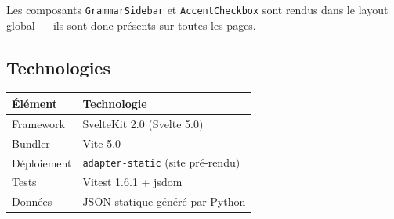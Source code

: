 Les composants \texttt{GrammarSidebar} et \texttt{AccentCheckbox} sont rendus dans le layout global --- ils sont donc présents sur toutes les pages.

\subsection{Technologies}

\begin{tabular}{ll}
  \toprule
  \textbf{Élément} & \textbf{Technologie} \\
  \midrule
  Framework & SvelteKit 2.0 (Svelte 5.0) \\
  Bundler & Vite 5.0 \\
  Déploiement & \texttt{adapter-static} (site pré-rendu) \\
  Tests & Vitest 1.6.1 + jsdom \\
  Données & JSON statique généré par Python \\
  \bottomrule
\end{tabular}
